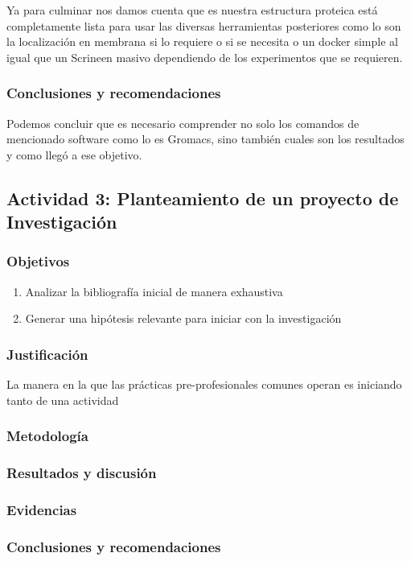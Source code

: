 \documentclass[a4paper,12pt]{article}
\begin{document}
          Ya para culminar nos damos cuenta que es nuestra estructura proteica está completamente lista para usar las diversas herramientas posteriores como lo son la localización en membrana si lo requiere o si se necesita o un docker simple al igual que un Scrineen masivo dependiendo de los experimentos que se requieren. 

         \subsubsection{Conclusiones y recomendaciones}  
         Podemos concluir que es necesario comprender no solo los comandos de mencionado software como lo es Gromacs, sino también cuales son los resultados y como llegó a ese objetivo.

    \subsection{Actividad 3: Planteamiento de un proyecto de Investigación}

         \subsubsection{Objetivos} 
         \begin{enumerate}
            \item Analizar la bibliografía inicial de manera exhaustiva
            \item Generar una hipótesis relevante para iniciar con la investigación
         \end{enumerate}
         \subsubsection{Justificación}
         La manera en la que las prácticas pre-profesionales comunes operan es iniciando tanto de una actividad 
         \subsubsection{Metodología}
         \subsubsection{Resultados y discusión}
         \subsubsection{Evidencias}
         \subsubsection{Conclusiones y recomendaciones} 
\end{document}
